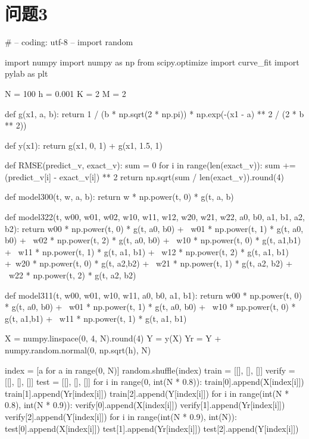 \section{问题3}
\begin{python}
    # -- coding: utf-8 --
import random

import numpy
import numpy as np
from scipy.optimize import curve_fit
import pylab as plt

N = 100
h = 0.001
K = 2
M = 2


def g(x1, a, b):
    return 1 / (b * np.sqrt(2 * np.pi)) * np.exp(-(x1 - a) ** 2 / (2 * b ** 2))


def y(x1):
    return g(x1, 0, 1) + g(x1, 1.5, 1)


def RMSE(predict_v, exact_v):
    sum = 0
    for i in range(len(exact_v)):
        sum += (predict_v[i] - exact_v[i]) ** 2
    return np.sqrt(sum / len(exact_v)).round(4)


def model300(t, w, a, b):
    return w * np.power(t, 0) * g(t, a, b)


def model322(t, w00, w01, w02,
             w10, w11, w12,
             w20, w21, w22,
             a0, b0, a1, b1, a2, b2):
    return w00 * np.power(t, 0) * g(t, a0, b0) + \
           w01 * np.power(t, 1) * g(t, a0, b0) + \
           w02 * np.power(t, 2) * g(t, a0, b0) + \
           w10 * np.power(t, 0) * g(t, a1,b1) + \
           w11 * np.power(t, 1) * g(t, a1, b1) + \
            w12 * np.power(t, 2) * g(t, a1, b1) +\
            w20 * np.power(t, 0) * g(t, a2,b2) + \
           w21 * np.power(t, 1) * g(t, a2, b2) + \
            w22 * np.power(t, 2) * g(t, a2, b2)


def model311(t, w00, w01,
             w10, w11,
             a0, b0, a1, b1):
    return w00 * np.power(t, 0) * g(t, a0, b0) + \
           w01 * np.power(t, 1) * g(t, a0, b0) + \
           w10 * np.power(t, 0) * g(t, a1,b1) + \
           w11 * np.power(t, 1) * g(t, a1, b1)


X = numpy.linspace(0, 4, N).round(4)
Y = y(X)
Yr = Y + numpy.random.normal(0, np.sqrt(h), N)

index = [a for a in range(0, N)]
random.shuffle(index)
train = [[], [], []]
verify = [[], [], []]
test = [[], [], []]
for i in range(0, int(N * 0.8)):
    train[0].append(X[index[i]])
    train[1].append(Yr[index[i]])
    train[2].append(Y[index[i]])
for i in range(int(N * 0.8), int(N * 0.9)):
    verify[0].append(X[index[i]])
    verify[1].append(Yr[index[i]])
    verify[2].append(Y[index[i]])
for i in range(int(N * 0.9), int(N)):
    test[0].append(X[index[i]])
    test[1].append(Yr[index[i]])
    test[2].append(Y[index[i]])


\end{python}
